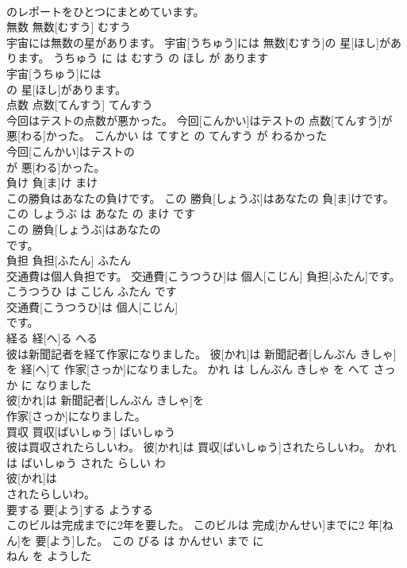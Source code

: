 \documentclass[8pt]{extreport}
\begin{document}
\begin{CJK}{UTF8}{min}
\\	のレポートをひとつにまとめています。			
\\	無数	無数[むすう]	むすう	
\\	宇宙には無数の星があります。	宇宙[うちゅう]には 無数[むすう]の 星[ほし]があります。	うちゅう に は むすう の ほし が あります	
\\	宇宙[うちゅう]には
\\	の 星[ほし]があります。			
\\	点数	点数[てんすう]	てんすう	
\\	今回はテストの点数が悪かった。	今回[こんかい]はテストの 点数[てんすう]が 悪[わる]かった。	こんかい は てすと の てんすう が わるかった	
\\	今回[こんかい]はテストの
\\	が 悪[わる]かった。			
\\	負け	負[ま]け	まけ	
\\	この勝負はあなたの負けです。	この 勝負[しょうぶ]はあなたの 負[ま]けです。	この しょうぶ は あなた の まけ です	
\\	この 勝負[しょうぶ]はあなたの
\\	です。			
\\	負担	負担[ふたん]	ふたん	
\\	交通費は個人負担です。	交通費[こうつうひ]は 個人[こじん] 負担[ふたん]です。	こうつうひ は こじん ふたん です	
\\	交通費[こうつうひ]は 個人[こじん]
\\	です。			
\\	経る	経[へ]る	へる	
\\	彼は新聞記者を経て作家になりました。	彼[かれ]は 新聞記者[しんぶん きしゃ]を 経[へ]て 作家[さっか]になりました。	かれ は しんぶん きしゃ を へて さっか に なりました	
\\	彼[かれ]は 新聞記者[しんぶん きしゃ]を
\\	作家[さっか]になりました。			
\\	買収	買収[ばいしゅう]	ばいしゅう	
\\	彼は買収されたらしいわ。	彼[かれ]は 買収[ばいしゅう]されたらしいわ。	かれ は ばいしゅう された らしい わ	
\\	彼[かれ]は
\\	されたらしいわ。			
\\	要する	要[よう]する	ようする	
\\	このビルは完成までに2年を要した。	このビルは 完成[かんせい]までに2 年[ねん]を 要[よう]した。	この びる は かんせい まで に 
\\	ねん を ようした	

\end{CJK}
\end{document}
